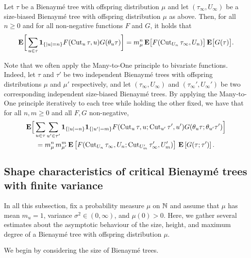 \documentclass[11pt,reqno]{amsart}
\newcommand{\Cut}{\operatorname{Cut}}
\begin{document}
\begin{prop}
\label{many-to-one}
Let $\tau$ be a Bienaymé tree with offspring distribution $\mu$ and let $(\tau_\infty,U_\infty)$ be a size-biased Bienaymé tree with offspring distribution $\mu$ as above. Then, for all $n\geq 0$ and for all non-negative functions $F$ and $G$, it holds that
 \[\E\bigg[\sum_{u\in \tau}\I{|u|=n}F(\Cut_u \tau,u)G(\theta_u\tau)\bigg]=m_\mu^n\, \E\big[F(\Cut_{U_n} \tau_\infty,U_n)\big]\, \E\big[G(\tau)\big].\]
\end{prop}

Note that we often apply the Many-to-One principle to bivariate functions. Indeed, let $\tau$ and $\tau'$ be two independent Bienaymé trees with offspring distributions $\mu$ and $\mu'$ respectively, and let $(\tau_\infty, U_\infty)$ and $(\tau_\infty', U_\infty')$ be two corresponding independent size-biased Bienaymé trees. By applying the Many-to-One principle iteratively to each tree while holding the other fixed, we have that for all $n, m \geq 0$ and all $F,G$ non-negative,
\begin{multline*}
    \E\Big[\sum_{u\in \tau}\sum_{u'\in \tau'}\I{|u|=n}\I{|u'|=m} F(\Cut_u \tau, u ; \Cut_{u'} \tau', u') G(\theta_u\tau ; \theta_{u'}\tau')\Big] \\ 
    = m_\mu^n\, m_{\mu'}^m\, \E\left[F(\Cut_{U_n} \tau_\infty, U_n ; \Cut_{U_m'} \tau'_\infty, U_m')\right]\, \E\left[G(\tau ; \tau')\right].
\end{multline*}

\subsection{Shape characteristics of critical Bienaym\'{e} trees with finite variance}

In all this subsection, fix a probability measure $\mu$ on $\mathbb{N}$ and assume that $\mu$ has mean $m_u=1$, variance $\sigma^2\in (0,\infty)$, and $\mu(0)>0$. Here, we gather several estimates about the asymptotic behaviour of the size, height, and maximum degree of a Bienaymé tree with offspring distribution $\mu$.

We begin by considering the size of Bienaymé trees.
\end{document}
